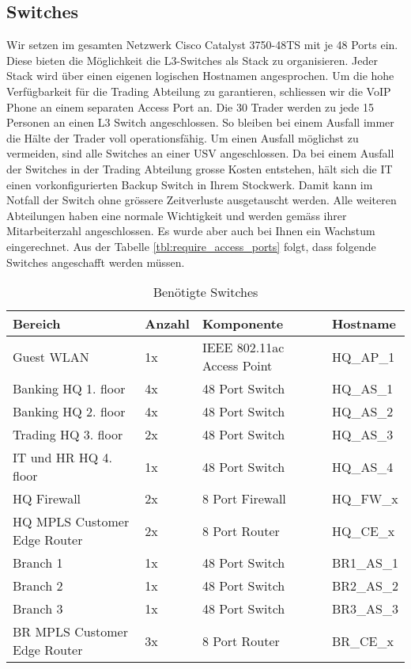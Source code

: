 \subsection{Switches}
Wir setzen im gesamten Netzwerk Cisco Catalyst 3750-48TS mit je 48 Ports ein. Diese bieten die Möglichkeit die L3-Switches als Stack zu organisieren. Jeder Stack wird über einen eigenen logischen Hostnamen angesprochen. Um die hohe Verfügbarkeit für die Trading Abteilung zu garantieren, schliessen wir die VoIP Phone an einem separaten Access Port an. Die 30 Trader werden zu jede 15 Personen an einen L3 Switch angeschlossen. So bleiben bei einem Ausfall immer die Hälte der Trader voll operationsfähig. Um einen Ausfall möglichst zu vermeiden, sind alle Switches an einer USV angeschlossen. Da bei einem Ausfall der Switches in der Trading Abteilung grosse Kosten entstehen, hält sich die IT einen vorkonfigurierten Backup Switch in Ihrem Stockwerk. Damit kann im Notfall der Switch ohne grössere Zeitverluste ausgetauscht werden. Alle weiteren Abteilungen haben eine normale Wichtigkeit und werden gemäss ihrer Mitarbeiterzahl angeschlossen. Es wurde aber auch bei Ihnen ein Wachstum eingerechnet. Aus der Tabelle \ref{tbl:require_access_ports} folgt, dass folgende Switches angeschafft werden müssen. 
\begin{table}[h]
	\centering
	\begin{tabu} to \linewidth {l l l X }
		\toprule 
		Bereich & Anzahl & Komponente & Hostname \\
		\midrule
		Guest WLAN & 1x & IEEE 802.11ac Access Point & HQ\_AP\_1 \\
		Banking HQ 1. floor & 4x & 48 Port Switch & HQ\_AS\_1 \\
		Banking HQ 2. floor & 4x & 48 Port Switch & HQ\_AS\_2 \\
		Trading HQ 3. floor & 2x & 48 Port Switch & HQ\_AS\_3 \\
		IT und HR HQ 4. floor & 1x & 48 Port Switch & HQ\_AS\_4 \\
		\midrule
		HQ Firewall & 2x & 8 Port Firewall & HQ\_FW\_x \\
		HQ MPLS Customer Edge Router & 2x & 8 Port Router & HQ\_CE\_x \\
		\midrule
		Branch 1 & 1x & 48 Port Switch & BR1\_AS\_1 \\
		Branch 2 & 1x & 48 Port Switch & BR2\_AS\_2 \\
		Branch 3 & 1x & 48 Port Switch & BR3\_AS\_3 \\
		BR MPLS Customer Edge Router & 3x & 8 Port Router & BR\_CE\_x \\
		\bottomrule 
	\end{tabu} 
	\caption{Benötigte Switches}
\end{table}

